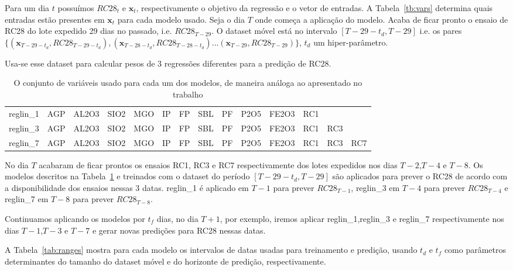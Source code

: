 Para um dia $t$ possuímos $RC28_t$ e $\textbf{x}_t$, respectivamente o objetivo
da regressão e o vetor de entradas. A Tabela~\ref{tb:vars} determina quais entradas estão presentes em $\textbf{x}_{t}$ para cada modelo usado.
Seja o dia $T$ onde começa a aplicação do modelo. Acaba de ficar pronto o ensaio
de RC28 do lote expedido 29 dias no passado, i.e. $RC28_{T-29}$.  O dataset móvel está no
intervalo $[T-29-t_d,T-29]$ i.e. os pares
$\{(\textbf{x}_{T-29-t_d},RC28_{T-29-t_d}), (\textbf{x}_{T-28-t_d},RC28_{T-28-t_d})
\dots (\textbf{x}_{T-29},RC28_{T-29})\}$, $t_d$ um hiper-parâmetro.

Usa-se esse dataset para calcular pesos de 3 regressões diferentes para a predição de RC28.


\begin{table}[]
  \centering 
  \begin{tabular}{llllllllllllll}
    \toprule
    reglin\_1 &  AGP &  AL2O3 &  SIO2 &  MGO &  IP &  FP &  SBL &  PF &  P2O5 &  FE2O3 &  RC1 &      &      \\
    reglin\_3 &  AGP &  AL2O3 &  SIO2 &  MGO &  IP &  FP &  SBL &  PF &  P2O5 &  FE2O3 &  RC1 &  RC3 &      \\
    reglin\_7 &  AGP &  AL2O3 &  SIO2 &  MGO &  IP &  FP &  SBL &  PF &  P2O5 &  FE2O3 &  RC1 &  RC3 &  RC7 \\
    \bottomrule
  \end{tabular}
  \caption{O conjunto de variáveis usado para cada um dos modelos, de maneira análoga ao apresentado no trabalho \cite{grecialin}}
  \label{tab:modelslin}
\end{table}


No dia $T$ acabaram de ficar prontos os ensaios RC1, RC3 e RC7 respectivamente
dos lotes expedidos nos dias $T-2$,$T-4$ e $T-8$. Os modelos descritos na 
Tabela~\ref{tab:modelslin} e treinados com o dataset do período 
$[T-29-t_d,T-29]$ são aplicados para prever o RC28 de acordo com a
disponibilidade dos ensaios nessas 3 datas. reglin\_1 é aplicado em $T-1$
para prever $RC28_{T-1}$,
reglin\_3 em $T-4$ para prever $RC28_{T-4}$ e reglin\_7 em $T-8$ para prever
$RC28_{T-8}$.

Continuamos aplicando os modelos por $t_f$ dias,
no dia $T+1$, por exemplo, iremos aplicar reglin\_1,reglin\_3 e
reglin\_7 respectivamente nos dias $T-1$,$T-3$ e $T-7$ e gerar novas predições
para RC28 nessas datas.  

A Tabela~\ref{tab:ranges} mostra para cada modelo os intervalos de
datas usadas para treinamento e predição, usando $t_d$ e $t_f$ como parâmetros
determinantes do tamanho do dataset móvel e do horizonte de predição, respectivamente.



